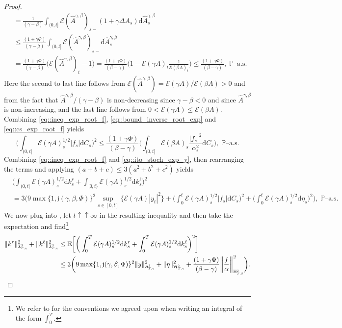 \documentclass[10pt]{article} %
\newcommand\cE{\mathcal E}
\newcommand\cH{\mathcal H}
\newcommand\cI{\mathcal I}
\newcommand\cS{\mathcal S}
\newcommand{\smalltext}[1]{\text{\fontsize{4}{4}\selectfont$#1$}}
\def \E{\mathbb{E}}
\def \H{\mathbb{H}}
\def \P{\mathbb{P}}
\def\d{\mathrm{d}}
\begin{document}
\begin{proof}
\begin{align}
		&= \frac{1}{(\gamma-\beta)}\int_{(0,t]} \cE(\widehat A^{\gamma,\beta})_{s-}(1+\gamma\Delta A_s) \d \widehat A^{\gamma,\beta}_s \nonumber\\
		&\leq \frac{(1+\gamma\Phi)}{(\gamma-\beta)}\int_{(0,t]} \cE(\widehat A^{\gamma,\beta})_{s-} \d \widehat A^{\gamma,\beta}_s \nonumber\\
		&= \frac{(1+\gamma\Phi)}{(\gamma-\beta)}\big(\cE(\widehat A^{\gamma,\beta})_t - 1\big) = \frac{(1+\gamma\Phi)}{(\beta-\gamma)}\bigg(1-\cE(\gamma A)_t\frac{1}{\cE(\beta A)_t}\bigg) \leq \frac{(1+\gamma\Phi)}{(\beta-\gamma)}, \; \text{$\P$--a.s.}
	\end{align}
	Here the second to last line follows from $\cE(\widehat A^{\gamma,\beta}) = \cE(\gamma A)/\cE(\beta A) > 0$ and from the fact that $\widehat A^{\gamma,\beta} / (\gamma-\beta)$ is non-decreasing since $\gamma-\beta < 0$ and since $\widehat A^{\gamma,\beta}$ is non-increasing, and the last line follows from $0 < \cE(\gamma A) \leq \cE(\beta A)$. Combining \eqref{eq::ineq_exp_root_f}, \eqref{eq::bound_inverse_root_exp} and \eqref{eq::cs_exp_root_f} yields 
	\begin{equation}\label{eq::ineq_exp_root_f}
		\bigg(\int_{(0,t]} \cE(\gamma A)^{1/2}_s |f_s| \d C_s\bigg)^2 
		\leq \frac{(1+\gamma\Phi)}{(\beta-\gamma)} \bigg(\int_{(0,t]} \cE(\beta A)_s \frac{|f_s|^2}{\alpha^2_s} \d C_s\bigg), \; \text{$\P$--a.s.}
	\end{equation}
	Combining \eqref{eq::ineq_exp_root_f} and \eqref{eq::ito_stoch_exp_y}, then rearranging the terms and applying $(a+b+c) \leq 3(a^2+b^2+c^2)$ yields
	\begin{align}\label{eq::estimate_k}
		&\bigg(\int_{(0,t]}\cE(\gamma A)^{1/2}_s \d k^r_s + \int_{[0,t)} \cE(\gamma A)^{1/2}_s \d k^\ell_s\bigg)^2 \nonumber\\
		&= 3\Bigg( 9\max\{1, \mathfrak{j}(\gamma,\beta,\Phi)\}^2 \sup_{s \in [0,t]}\{\cE(\gamma A)|y_t|^2\} + \bigg(\int_0^t \cE(\gamma A)^{1/2}_s |f_s| \d C_s\bigg)^2 + \bigg(\int_0^t \cE(\gamma A)^{1/2}_s \d\eta_s\bigg)^2\Bigg), \; \text{$\P$--a.s.}
	\end{align}
	We now plug  into , let $t \uparrow\uparrow \infty$ in the resulting inequality and then take the expectation and find\footnote{We refer to  for the conventions we agreed upon when writing an integral of the form $\int_0^T$.}
	\begin{align*}
		\|k^r\|^2_{\cI^\smalltext{2}_{\smalltext{T}\smalltext{,}\smalltext{\gamma}}} + \|k^\ell\|^2_{\cI^\smalltext{2}_{\smalltext{T}\smalltext{,}\smalltext{\gamma}}} 
		&\leq \E\bigg[\bigg(\int_0^T\cE(\gamma A)^{1/2}_s \d k^r_s + \int_0^T \cE(\gamma A)^{1/2}_s \d k^\ell_s\bigg)^2\bigg] \\
		&\leq 3\bigg(9\max\{1,\mathfrak{j}(\gamma,\beta,\Phi)\}^2\|y\|^2_{\cS^\smalltext{2}_{\smalltext{T}\smalltext{,}\smalltext{\gamma}}} + \|\eta\|^2_{\cH^\smalltext{2}_{\smalltext{T}\smalltext{,}\smalltext{\gamma}}} + \frac{(1+\gamma\Phi)}{(\beta-\gamma)}\bigg\|\frac{f}{\alpha}\bigg\|^2_{\H^\smalltext{2}_{\smalltext{T}\smalltext{,}\smalltext{\beta}}}  \bigg).
	\end{align*}
	

\end{proof}
\end{document}
